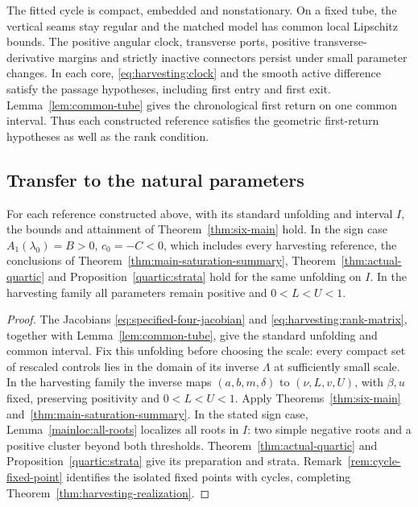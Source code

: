 The fitted cycle is compact, embedded and nonstationary. On a fixed tube,
the vertical seams stay regular and the matched model has common local
Lipschitz bounds. The positive angular clock, transverse ports, positive
transverse-derivative margins and strictly inactive connectors persist under
small parameter changes. In each core,
\eqref{eq:harvesting:clock} and the smooth active difference satisfy the
passage hypotheses, including first entry and first exit.
Lemma~\ref{lem:common-tube} gives the chronological first return on one
common interval. Thus each constructed reference satisfies the geometric
first-return hypotheses as well as the rank condition.

\subsection{Transfer to the natural parameters}

\begin{corollary}
\label{cor:realization-transfer}
For each reference constructed above, with its standard unfolding and
interval \(I\), the bounds and attainment of Theorem~\ref{thm:six-main} hold.
In the sign case $A_1(\lambda_0)=B>0$, $c_0=-C<0$, which includes every
harvesting reference, the conclusions of
Theorem~\ref{thm:main-saturation-summary}, Theorem~\ref{thm:actual-quartic}
and Proposition~\ref{quartic:strata} hold for the same unfolding on \(I\).
In the harvesting family all parameters remain positive and $0<L<U<1$.
\end{corollary}

\begin{proof}
The Jacobians \eqref{eq:specified-four-jacobian} and
\eqref{eq:harvesting:rank-matrix}, together with
Lemma~\ref{lem:common-tube}, give the standard unfolding and common interval.
Fix this unfolding before choosing the scale: every compact set of rescaled
controls lies in the domain of its inverse \(\Lambda\) at sufficiently small
scale. In the harvesting family the inverse maps \((a,b,m,\delta)\) to
\((\nu,L,v,U)\), with \(\beta,u\) fixed, preserving positivity and
$0<L<U<1$. Apply Theorems~\ref{thm:six-main}
and~\ref{thm:main-saturation-summary}. In the stated sign case,
Lemma~\ref{mainloc:all-roots} localizes all roots in \(I\): two simple
negative roots and a positive cluster beyond both thresholds.
Theorem~\ref{thm:actual-quartic} and Proposition~\ref{quartic:strata}
give its preparation and strata. Remark~\ref{rem:cycle-fixed-point}
identifies the isolated fixed points with cycles, completing
Theorem~\ref{thm:harvesting-realization}.
\end{proof}

